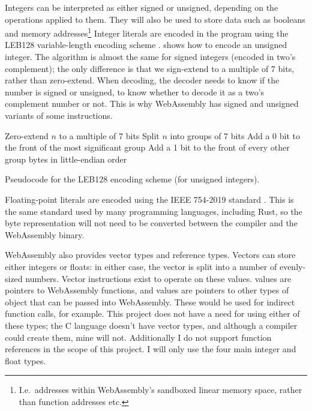 \documentclass[00-main.tex]{subfiles}
\begin{document}
Integers can be interpreted as either signed or unsigned, depending on the operations applied to them.
They will also be used to store data such as booleans and memory addresses\footnote{I.e.\ addresses within WebAssembly's sandboxed linear memory space, rather than function addresses etc.}
Integer literals are encoded in the program using the LEB128 variable-length encoding scheme .
 shows how to encode an unsigned integer.
The algorithm is almost the same for signed integers (encoded in two's complement); the only difference is that we sign-extend to a multiple of 7 bits, rather than zero-extend.
When decoding, the decoder needs to know if the number is signed or unsigned, to know whether to decode it as a two's complement number or not.
This is why WebAssembly has signed and unsigned variants of some instructions.

\begin{listing}[ht]
  \begin{PseudocodeListing}
      \State Zero-extend $n$ to a multiple of 7 bits
      \State Split $n$ into groups of 7 bits
      \State Add a 0 bit to the front of the most significant group
      \State Add a 1 bit to the front of every other group
      \State \Return bytes in little-endian order
    \EndFunction
  \end{PseudocodeListing}
  \caption{Pseudocode for the LEB128 encoding scheme (for unsigned integers).}
  \label{lst:leb128 pseudocode}
\end{listing}

Floating-point literals are encoded using the IEEE 754-2019 standard . %
This is the same standard used by many programming languages, including Rust, so the byte representation will not need to be converted between the compiler and the WebAssembly binary.

WebAssembly also provides vector types and reference types.
Vectors can store either integers or floats: in either case, the vector is split into a number of evenly-sized numbers.
Vector instructions exist to operate on these values.
 values are pointers to WebAssembly functions, and  values are pointers to other types of object that can be passed into WebAssembly. These would be used for indirect function calls, for example.
This project does not have a need for using either of these types; the C language doesn't have vector types, and although a compiler could create them, mine will not.
Additionally I do not support function references in the scope of this project.
I will only use the four main integer and float types.
\end{document}
